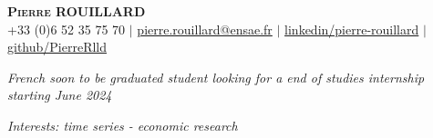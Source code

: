 \documentclass[letterpaper,10pt]{article}
\begin{document}
\begin{center}
{\Large\textsc{\textbf{Pierre ROUILLARD}}} \\ \vspace{2pt}
\small +33 (0)6 52 35 75 70 $|$ \href{mailto:pierre.rouillard@ensae.fr}{pierre.rouillard@ensae.fr} $|$
\href{https://www.linkedin.com/in/pierre-rouillard/}{linkedin/pierre-rouillard} $|$
\href{https://github.com/PierreRlld}{github/PierreRlld}\\
\vspace{.1cm}
\end{center}

\begin{center}
    \textit{French soon to be graduated student looking for a end of studies internship starting June 2024}\par
    \textit{Interests: time series - economic research }
\end{center}

\end{document}
